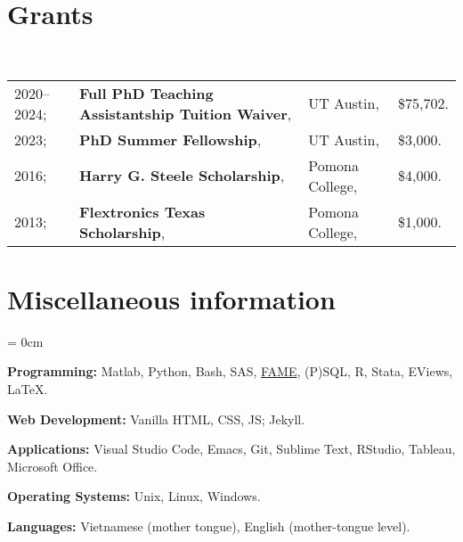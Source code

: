 \documentclass[a4paper, 10pt]{article}
\begin{document}
  \section{Grants}
  ~\begin{tabular}{llll}
    2020--2024; & \textbf{Full PhD Teaching Assistantship Tuition Waiver}, & UT Austin, & \$75,702.\\
    2023; & \textbf{PhD Summer Fellowship}, & UT Austin, & \$3,000.\\
    2016; & \textbf{Harry G. Steele Scholarship}, & Pomona College, & \$4,000.\\
    2013; & \textbf{Flextronics Texas Scholarship}, & Pomona College, & \$1,000.
  \end{tabular}
  \vspace*{0.25em}
    
  \section{Miscellaneous information}
  \begin{compactitem}\parskip = 0cm
    \item \textbf{Programming:} Matlab, Python, Bash, SAS, \href{https://en.wikipedia.org/wiki/FAME_(database)}{FAME}, (P)SQL, R, Stata, EViews, \LaTeX.
    \item \textbf{Web Development:} Vanilla HTML, CSS, JS; Jekyll.
    \item \textbf{Applications:} Visual Studio Code, Emacs, Git, Sublime Text, RStudio, Tableau, Microsoft Office.
    \item \textbf{Operating Systems:} Unix, Linux, Windows.
    \item \textbf{Languages:} Vietnamese (mother tongue), English (mother-tongue level).
  \end{compactitem}
\end{document}
